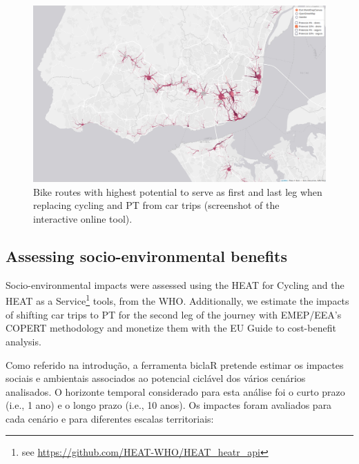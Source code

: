 \documentclass[runningheads]{llncs}
\begin{document}
\begin{figure}

{\centering \includegraphics[width=0.8\linewidth,]{img/map2} 

}

\caption{Bike routes with highest potential to serve as first and last leg when replacing cycling and PT from car trips (screenshot of the interactive online tool).}\label{fig:map2}
\end{figure}

\hypertarget{assessing-socio-environmental-benefits}{%
\subsection{Assessing socio-environmental
benefits}\label{assessing-socio-environmental-benefits}}

Socio-environmental impacts were assessed using the HEAT for Cycling and
the HEAT as a Service\footnote{see
  \url{https://github.com/HEAT-WHO/HEAT_heatr_api}} tools, from the WHO.
Additionally, we estimate the impacts of shifting car trips to PT for
the second leg of the journey with EMEP/EEA's COPERT methodology and
monetize them with the EU Guide to cost-benefit analysis.

Como referido na introdução, a ferramenta biclaR pretende estimar os
impactes sociais e ambientais associados ao potencial ciclável dos
vários cenários analisados. O horizonte temporal considerado para esta
análise foi o curto prazo (i.e., 1 ano) e o longo prazo (i.e., 10 anos).
Os impactes foram avaliados para cada cenário e para diferentes escalas
territoriais:
\end{document}
